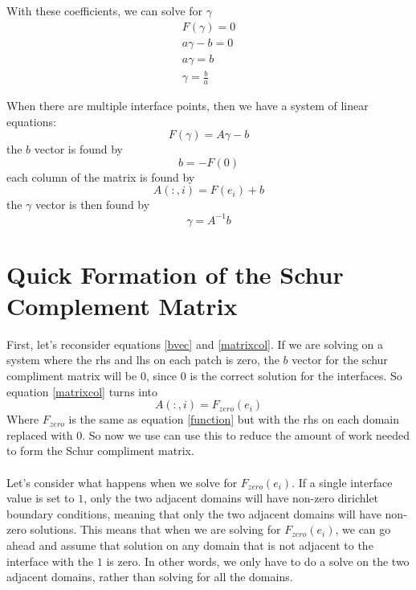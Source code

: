\documentclass[12pt]{article}
\begin{document}
With these coefficients, we can solve for $\gamma$
\begin{align}
F(\gamma)=0\\
a\gamma-b=0\\
a\gamma=b\\
\gamma=\frac{b}{a}
\end{align}

When there are multiple interface points, then we have a system of linear equations:
\begin{equation}
F(\gamma)=A\gamma-b
\end{equation}
the $b$ vector is found by
\begin{equation}
b=-F(0)
    \label{bvec}
\end{equation}
each column of the matrix is found by
\begin{equation}
A(:,i) = F(e_i)+b
    \label{matrixcol}
\end{equation}
the $\gamma$ vector is then found by 
\begin{equation}
\gamma=A^{-1}b
\end{equation}

\section{Quick Formation of the Schur Complement Matrix}
First, let's reconsider equations  \ref{bvec} and \ref{matrixcol}. If we are solving on a system
where the rhs and lhs on each patch is zero, the $b$ vector for the schur compliment matrix will
be $0$, since $0$ is the correct solution for the interfaces. So equation \ref{matrixcol} turns into
\begin{equation}
    A(:,i) = F_{zero}(e_i)
\end{equation}
Where $F_{zero}$ is the same as equation \ref{function} but with the rhs on each domain replaced 
with $0$.
So now we use can use this to reduce the amount of work needed to form the Schur compliment matrix.
\\
\\
Let's consider what happens when we solve for $F_{zero}(e_i)$. If a single interface value is set
to $1$, only the two adjacent domains will have non-zero dirichlet boundary conditions, meaning that
only the two adjacent domains will have non-zero solutions. This means that when we are solving for 
$F_{zero}(e_i)$, we can go ahead and assume that solution on any domain that is not adjacent to the interface
with the $1$ is zero. In other words, we only have to do a solve on the two adjacent domains, rather
than solving for all the domains.
\end{document}
